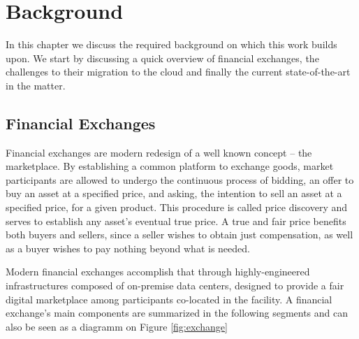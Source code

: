 \chapter{Background}


In this chapter we discuss the required background on which this work builds upon.
We start by discussing a quick overview of financial exchanges, the challenges to their 
migration to the cloud and finally the current state-of-the-art in the matter.

\section{Financial Exchanges}
Financial exchanges are modern redesign of a well known concept -- the marketplace.
By establishing a common platform to exchange goods, market participants are allowed to 
    undergo the continuous process of bidding, an offer to buy an asset at a specified price, and 
    asking, the intention to sell an asset at a specified price, for a given product.
This procedure is called price discovery and serves to establish any asset's eventual true price.
A true and fair price benefits both buyers and sellers, since a seller wishes to obtain just compensation, as well as a buyer 
    wishes to pay nothing beyond what is needed.

Modern financial exchanges accomplish that through highly-engineered infrastructures composed of 
    on-premise data centers, designed to provide a fair digital marketplace among participants co-located 
    in the facility. 
A financial exchange's main components are summarized in the following segments and can also be seen 
    as a diagramm on Figure \ref{fig:exchange}


